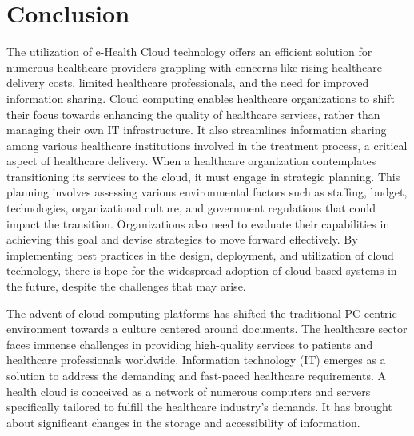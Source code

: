 \documentclass{article}
\begin{document}
\section{Conclusion}
The utilization of e-Health Cloud technology offers an efficient solution for numerous healthcare providers grappling with concerns like rising healthcare delivery costs, limited healthcare professionals, and the need for improved information sharing. Cloud computing enables healthcare organizations to shift their focus towards enhancing the quality of healthcare services, rather than managing their own IT infrastructure. It also streamlines information sharing among various healthcare institutions involved in the treatment process, a critical aspect of healthcare delivery.
When a healthcare organization contemplates transitioning its services to the cloud, it must engage in strategic planning. This planning involves assessing various environmental factors such as staffing, budget, technologies, organizational culture, and government regulations that could impact the transition. Organizations also need to evaluate their capabilities in achieving this goal and devise strategies to move forward effectively. By implementing best practices in the design, deployment, and utilization of cloud technology, there is hope for the widespread adoption of cloud-based systems in the future, despite the challenges that may arise.

The advent of cloud computing platforms has shifted the traditional PC-centric environment towards a culture centered around documents. The healthcare sector faces immense challenges in providing high-quality services to patients and healthcare professionals worldwide. Information technology (IT) emerges as a solution to address the demanding and fast-paced healthcare requirements. A health cloud is conceived as a network of numerous computers and servers specifically tailored to fulfill the healthcare industry's demands. It has brought about significant changes in the storage and accessibility of information.
\end{document}
